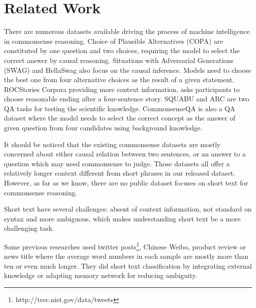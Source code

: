 \section{Related Work}

There are numerous datasets available driving the process of machine intelligence in commonsense reasoning. Choice of Plausible Alternatives (COPA) \cite{roemmele2011choice} are constituted by one question and two choices, requiring the model to select the correct answer by causal reasoning. %
Situations with Adversarial Generations (SWAG) \cite{zellers2018swag} and HellaSwag \cite{DBLP:journals/corr/abs-1905-07830}
also focus on the causal inference. Models need to choose the best one from four alternative choices as the result of a given statement. ROCStories Corpora \cite{mostafazadeh2016corpus} %
providing more context information, asks participants to choose reasonable ending after a four-sentence story. SQUABU \cite{davis2016write} and ARC \cite{clark2018think} are two QA tasks for testing the scientific knowledge. CommonsenseQA \cite{talmor2019commonsenseqa} is also a QA dataset where the model needs to select the correct concept as the answer of given question from four candidates using background knowledge.

It should be noticed that the existing commonsense datasets are mostly concerned about either causal relation between two sentences, or an answer to a question which may need commonsense to judge. Those datasets all offer a relatively longer context different from short phrases in our released dataset. 
However, as far as we know, there are no public dataset focuses on short text for commonsense reasoning.

Short text have several challenges: absent of context information, not standard on syntax and more ambiguous, which makes understanding short text be a more challenging task.%
 
Some previous researches used twitter posts\footnote{http://trec.nist.gov/data/tweets}, Chinese Weibo\cite{he2016extracting}, product review\cite{pang2005seeing} or news title\cite{vitale2012classification} where the average word numbers in each sample are mostly more than ten or even much longer. They did short text classification by integrating external knowledge\cite{wang2017combining,chen2019deep} or adapting memory network\cite{zeng2018topic} for reducing ambiguity. 

